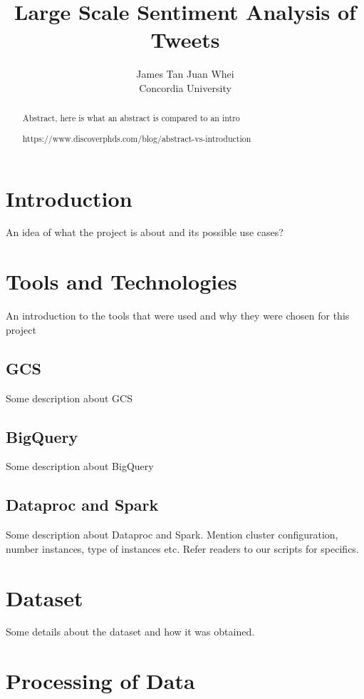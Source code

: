 \documentclass[a4paper,12pt]{article}
\begin{document}
\title{Large Scale Sentiment Analysis of Tweets }%
\author{
	James Tan Juan Whei\\
	Concordia University
}  
\maketitle

\begin{abstract}
Abstract, here is what an abstract is compared to an intro

https://www.discoverphds.com/blog/abstract-vs-introduction
\end{abstract}

\section{Introduction}

An idea of what the project is about and its possible use cases?

\section{Tools and Technologies}
An introduction to the tools that were used and why they were chosen for this project

\subsection{GCS}
Some description about GCS

\subsection{BigQuery}
Some description about BigQuery

\subsection{Dataproc and Spark}
\label{sec:spark}
Some description about Dataproc and Spark. Mention cluster configuration, number instances, type of instances etc. Refer readers to our scripts for specifics.

\section{Dataset}
\label{sec:dataset}
Some details about the dataset and how it was obtained.

\section{Processing of Data}
\end{document}
